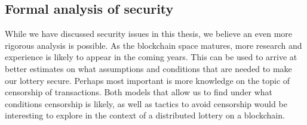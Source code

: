 \subsection{Formal analysis of security}

While we have discussed security issues in this thesis, we believe an even more rigorous analysis is possible. As the blockchain space matures, more research and experience is likely to appear in the coming years. This can be used to arrive at better estimates on what assumptions and conditions that are needed to make our lottery secure. Perhaps most important is more knowledge on the topic of censorship of transactions. Both models that allow us to find under what conditions censorship is likely, as well as tactics to avoid censorship would be interesting to explore in the context of a distributed lottery on a blockchain.
